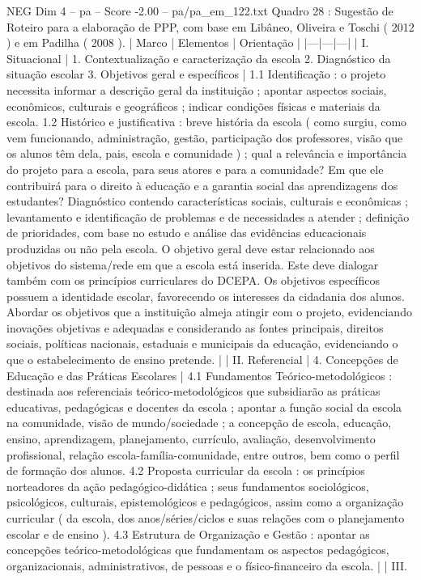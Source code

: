 \begin{textsample}{NEG Dim 4 – pa – Score -2.00 – pa/pa\_em\_122.txt}  \label{ex:f4_neg_273}
Quadro 28 : Sugestão de Roteiro para a elaboração de PPP, com base em Libâneo, Oliveira e Toschi ( 2012 ) e em Padilha ( 2008 ). | Marco | Elementos | Orientação | |---|---|---| | I.
Situacional | 1.
Contextualização e caracterização da escola 2.
Diagnóstico da situação escolar 3.
Objetivos geral e específicos | 1.1 Identificação : o projeto necessita informar a descrição geral da instituição ; apontar aspectos sociais, econômicos, culturais e geográficos ; indicar condições físicas e materiais da escola. 1.2 Histórico e justificativa : breve história da escola ( como surgiu, como vem funcionando, administração, gestão, participação dos professores, visão que os alunos têm dela, pais, escola e comunidade ) ; qual a relevância e importância do projeto para a escola, para seus atores e para a comunidade?
Em que ele contribuirá para o direito à educação e a garantia social das aprendizagens dos estudantes?
Diagnóstico contendo características sociais, culturais e econômicas ; levantamento e identificação de problemas e de necessidades a atender ; definição de prioridades, com base no estudo e análise das evidências educacionais produzidas ou não pela escola.
O objetivo geral deve estar relacionado aos objetivos do sistema/rede em que a escola está inserida.
Este deve dialogar também com os princípios curriculares do DCEPA.
Os objetivos específicos possuem a identidade escolar, favorecendo os interesses da cidadania dos alunos.
Abordar os objetivos que a instituição almeja atingir com o projeto, evidenciando inovações objetivas e adequadas e considerando as fontes principais, direitos sociais, políticas nacionais, estaduais e municipais da educação, evidenciando o que o estabelecimento de ensino pretende. | | II.
Referencial | 4.
Concepções de Educação e das Práticas Escolares | 4.1 Fundamentos Teórico-metodológicos : destinada aos referenciais teórico-metodológicos que subsidiarão as práticas educativas, pedagógicas e docentes da escola ; apontar a função social da escola na comunidade, visão de mundo/sociedade ; a concepção de escola, educação, ensino, aprendizagem, planejamento, currículo, avaliação, desenvolvimento profissional, relação escola-família-comunidade, entre outros, bem como o perfil de formação dos alunos. 4.2 Proposta curricular da escola : os princípios norteadores da ação pedagógico-didática ; seus fundamentos sociológicos, psicológicos, culturais, epistemológicos e pedagógicos, assim como a organização curricular ( da escola, dos anos/séries/ciclos e suas relações com o planejamento escolar e de ensino ). 4.3 Estrutura de Organização e Gestão : apontar as concepções teórico-metodológicas que fundamentam os aspectos pedagógicos, organizacionais, administrativos, de pessoas e o físico-financeiro da escola. | | III.

\end{textsample}
